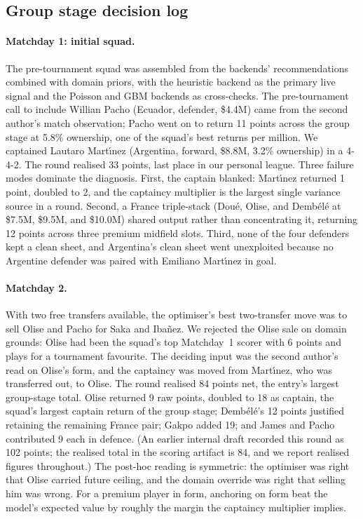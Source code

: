 \subsection{Group stage decision log}
\label{sec:live-group}

\paragraph{Matchday 1: initial squad.}
The pre-tournament squad was assembled from the backends'
recommendations combined with domain priors, with the heuristic
backend as the primary live signal and the Poisson and GBM backends
as cross-checks. The pre-tournament call to include Willian Pacho
(Ecuador, defender, \$4.4M) came from the second author's match
observation; Pacho went on to return 11 points across the group
stage at 5.8\% ownership, one of the squad's best returns per
million. We captained Lautaro Mart\'{\i}nez (Argentina, forward,
\$8.8M, 3.2\% ownership) in a 4-4-2. The round realised 33 points,
last place in our personal league. Three failure modes dominate the
diagnosis. First, the captain blanked: Mart\'{\i}nez returned 1 point,
doubled to 2, and the captaincy multiplier is the largest single
variance source in a round. Second, a France triple-stack (Dou\'e,
Olise, and Demb\'el\'e at \$7.5M, \$9.5M, and \$10.0M) shared output
rather than concentrating it, returning 12 points across three
premium midfield slots. Third, none of the four defenders kept a
clean sheet, and Argentina's clean sheet went unexploited because no
Argentine defender was paired with Emiliano Mart\'{\i}nez in goal.

\paragraph{Matchday 2.}
With two free transfers available, the optimiser's best two-transfer
move was to sell Olise and Pacho for Saka and Iba\~nez. We rejected
the Olise sale on domain grounds: Olise had been the squad's top
Matchday~1 scorer with 6 points and plays for a tournament
favourite. The deciding input was the second author's read on
Olise's form, and the captaincy was moved from Mart\'{\i}nez, who was
transferred out, to Olise. The round realised 84 points net, the
entry's largest group-stage total. Olise returned 9 raw points,
doubled to 18 as captain, the squad's largest captain return of the
group stage; Demb\'el\'e's 12 points justified retaining the
remaining France pair; Gakpo added 19; and James and Pacho
contributed 9 each in defence. (An earlier internal draft recorded
this round as 102 points; the realised total in the scoring artifact
is 84, and we report realised figures throughout.) The post-hoc
reading is symmetric: the optimiser was right that Olise carried
future ceiling, and the domain override was right that selling him
was wrong. For a premium player in form, anchoring on form beat the
model's expected value by roughly the margin the captaincy
multiplier implies.

